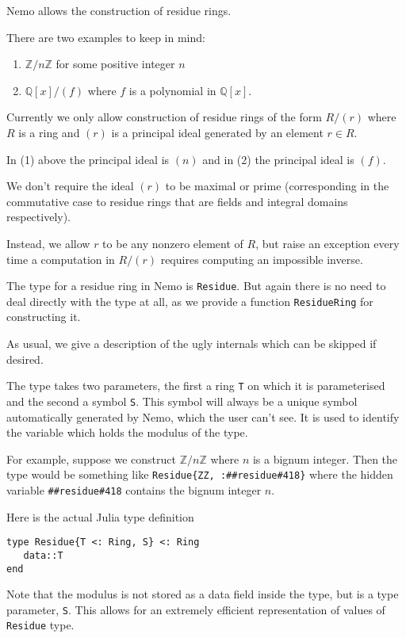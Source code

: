 \documentclass[a4paper,10pt]{article}
\newcommand{\Z}{\mathbb{Z}}
\newcommand{\Q}{\mathbb{Q}}
\newcommand{\code}{\lstinline}
\begin{document}
{{{Nemo allows the construction of residue rings. 

There are two examples to keep in mind:

\begin{enumerate}
\item $\Z/n\Z$ for some positive integer $n$

\item $\Q[x]/(f)$ where $f$ is a polynomial in $\Q[x]$.
\end{enumerate}

Currently we only allow construction of residue rings of the form $R/(r)$ where
$R$ is a ring and $(r)$ is a principal ideal generated by an element $r \in R$. 

In (1) above the principal ideal is $(n)$ and in (2) the principal
ideal is $(f)$.

We don't require the ideal $(r)$ to be maximal or prime (corresponding in the
commutative case to residue rings that are fields and integral domains 
respectively). 

Instead, we allow $r$ to be any nonzero element of $R$, but raise an exception
every time a computation in $R/(r)$ requires computing an impossible inverse.

The type for a residue ring in Nemo is \code{Residue}. But again there is no
need to deal directly with the type at all, as we provide a function
\code{ResidueRing} for constructing it.

As usual, we give a description of the ugly internals which can be skipped if
desired.

The type takes two parameters, the first a ring \code{T} on which it is
parameterised and the second a symbol \code{S}. This symbol will always be
a unique symbol automatically generated by Nemo, which the user can't see. It
is used to identify the variable which holds the modulus of the type.

For example, suppose we construct $\Z/n\Z$ where $n$ is a bignum integer. Then
the type would be something like \code|Residue{ZZ, :##residue#418}| where the
hidden variable \code{##residue#418} contains the bignum integer $n$.

Here is the actual Julia type definition

\begin{lstlisting}
type Residue{T <: Ring, S} <: Ring
   data::T
end
\end{lstlisting}

Note that the modulus is not stored as a data field inside the type, but is
a type parameter, \code{S}. This allows for an extremely efficient 
representation of values of \code{Residue} type.

}}}
\end{document}
